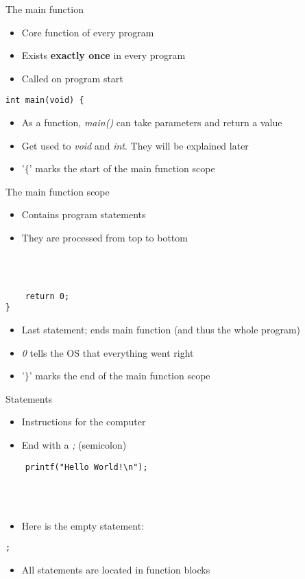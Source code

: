 \documentclass[10pt,graphics,aspectratio=169,table]{beamer}
\begin{document}
\begin{frame}[fragile]{The main function}
	\begin{itemize}
		\item Core function of every program
		\item Exists \textbf{exactly once} in every program
		\item Called on program start
	\end{itemize}
	\begin{lstlisting}
int main(void) {
\end{lstlisting}
	\begin{itemize}
		\item As a function, \textit{main()} can take parameters and return a value
		\item Get used to \textit{void} and \textit{int}. They will be explained later
		\item '$\lbrace$' marks the start of the main function scope
	\end{itemize}
\end{frame}
\begin{frame}[fragile]{The main function scope}
	\begin{itemize}
		\item Contains program statements
		\item They are processed from top to bottom
	\end{itemize} \ \\
	\ \\
	\begin{lstlisting}
	return 0;
}
\end{lstlisting}
	\begin{itemize}
		\item Last statement; ends main function (and thus the whole program)
		\item \textit{0} tells the OS that everything went right
		\item '$\rbrace$' marks the end of the main function scope
	\end{itemize}
\end{frame}
\begin{frame}[fragile]{Statements}
	\begin{itemize}
		\item Instructions for the computer
		\item End with a \textit{;} (semicolon)
	\end{itemize}
	\begin{lstlisting}
	printf("Hello World!\n");
\end{lstlisting} \ \\ \ \\
	\begin{itemize}
		\item Here is the empty statement:
	\end{itemize}
	\begin{lstlisting}[numbers=none]
	;
\end{lstlisting}
	\begin{itemize}
		\item All statements are located in function blocks
	\end{itemize}
\end{frame}
\end{document}
